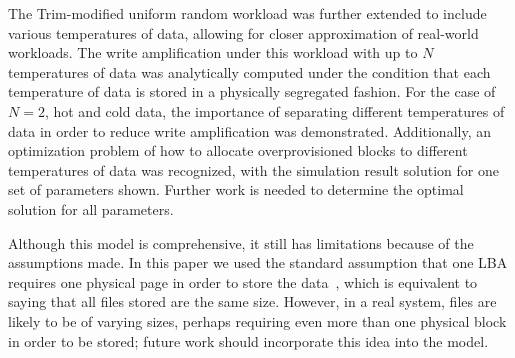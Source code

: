 \documentclass[prodmode,acmtos]{acmsmall}
\begin{document}
The Trim-modified uniform random workload was further extended to include various temperatures of data, allowing for closer approximation of real-world workloads.  The write amplification under this workload with up to $N$ temperatures of data was analytically computed under the condition that each temperature of data is stored in a physically segregated fashion.  For the case of $N=2$, hot and cold data, the importance of separating different temperatures of data in order to reduce write amplification was demonstrated.  Additionally, an optimization problem of how to allocate overprovisioned blocks to different temperatures of data was recognized, with the simulation result solution for one set of parameters shown.  Further work is needed to determine the optimal solution for all parameters.

Although this model is comprehensive, it still has limitations because of the assumptions made.  In this paper we used the standard assumption that one LBA requires one physical page in order to store the data~\cite{Hu2009,hu2010fundamental,agarwal2010closed,xiang2011improved}, which is equivalent to saying that all files stored are the same size.  However, in a real system, files are likely to be of varying sizes, perhaps requiring even more than one physical block in order to be stored; future work should incorporate this idea into the model.













\end{document}
